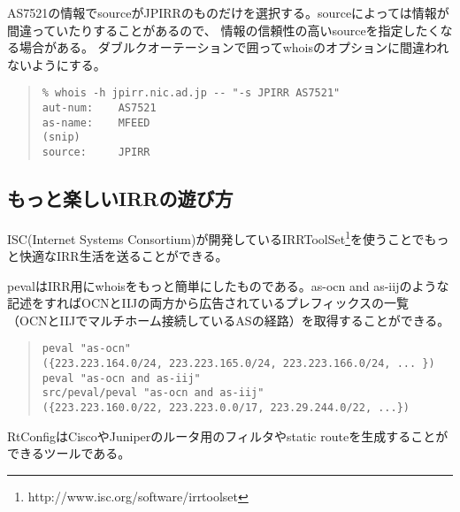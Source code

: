 AS7521の情報でsourceがJPIRRのものだけを選択する。sourceによっては情報が間違っていたりすることがあるので、
情報の信頼性の高いsourceを指定したくなる場合がある。
ダブルクオーテーションで囲ってwhoisのオプションに間違われないようにする。

\begin{quote}
\begin{minilinespace}
\begin{verbatim}
% whois -h jpirr.nic.ad.jp -- "-s JPIRR AS7521"
aut-num:    AS7521
as-name:    MFEED
(snip)
source:     JPIRR
\end{verbatim}
\end{minilinespace}
\end{quote}

\subsection{もっと楽しいIRRの遊び方}

ISC(Internet Systems Consortium)が開発しているIRRToolSet\footnote{http://www.isc.org/software/irrtoolset}を使うことでもっと快適なIRR生活を送ることができる。

pevalはIRR用にwhoisをもっと簡単にしたものである。as-ocn and as-iijのような記述をすればOCNとIIJの両方から広告されているプレフィックスの一覧
（OCNとIIJでマルチホーム接続しているASの経路）を取得することができる。

\begin{quote}
\begin{minilinespace}
\begin{verbatim}
peval "as-ocn"
({223.223.164.0/24, 223.223.165.0/24, 223.223.166.0/24, ... })
peval "as-ocn and as-iij"
src/peval/peval "as-ocn and as-iij"
({223.223.160.0/22, 223.223.0.0/17, 223.29.244.0/22, ...})
\end{verbatim}
\end{minilinespace}
\end{quote}

RtConfigはCiscoやJuniperのルータ用のフィルタやstatic routeを生成することができるツールである。

